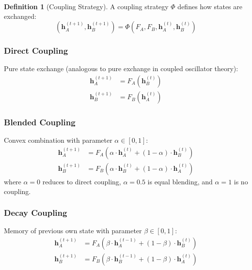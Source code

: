 \documentclass[10pt]{article} %
\theoremstyle{plain}
\theoremstyle{definition}
\newtheorem{definition}[theorem]{Definition}
\theoremstyle{remark}
\renewcommand{\vect}[1]{\bm{#1}}
\begin{document}
\begin{definition}[Coupling Strategy]
A coupling strategy $\Phi$ defines how states are exchanged:
\begin{equation}
    (\vect{h}_A^{(t+1)}, \vect{h}_B^{(t+1)}) = \Phi(F_A, F_B, \vect{h}_A^{(t)}, \vect{h}_B^{(t)})
\end{equation}
\end{definition}

\subsubsection{Direct Coupling}
Pure state exchange (analogous to pure exchange in coupled oscillator theory):
\begin{align}
    \vect{h}_A^{(t+1)} &= F_A(\vect{h}_B^{(t)}) \\
    \vect{h}_B^{(t+1)} &= F_B(\vect{h}_A^{(t)})
\end{align}

\subsubsection{Blended Coupling}
Convex combination with parameter $\alpha \in [0,1]$:
\begin{align}
    \vect{h}_A^{(t+1)} &= F_A(\alpha \cdot \vect{h}_A^{(t)} + (1-\alpha) \cdot \vect{h}_B^{(t)}) \\
    \vect{h}_B^{(t+1)} &= F_B(\alpha \cdot \vect{h}_B^{(t)} + (1-\alpha) \cdot \vect{h}_A^{(t)})
\end{align}
where $\alpha = 0$ reduces to direct coupling, $\alpha = 0.5$ is equal blending, and $\alpha = 1$ is no coupling.

\subsubsection{Decay Coupling}
Memory of previous own state with parameter $\beta \in [0,1]$:
\begin{align}
    \vect{h}_A^{(t+1)} &= F_A(\beta \cdot \vect{h}_A^{(t-1)} + (1-\beta) \cdot \vect{h}_B^{(t)}) \\
    \vect{h}_B^{(t+1)} &= F_B(\beta \cdot \vect{h}_B^{(t-1)} + (1-\beta) \cdot \vect{h}_A^{(t)})
\end{align}
\end{document}
